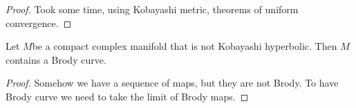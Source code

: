 \begin{proof}\leavevmode
Took some time, using Kobayashi metric, theorems of uniform convergence.
\end{proof}

\begin{thm}\leavevmode
	Let $M$be a compact complex manifold that is not Kobayashi hyperbolic. Then $M$ contains a Brody curve.
\end{thm}

\begin{proof}\leavevmode
Somehow we have a sequence of maps, but they are not Brody. To have Brody curve we need to take the limit of Brody maps.
\end{proof}





